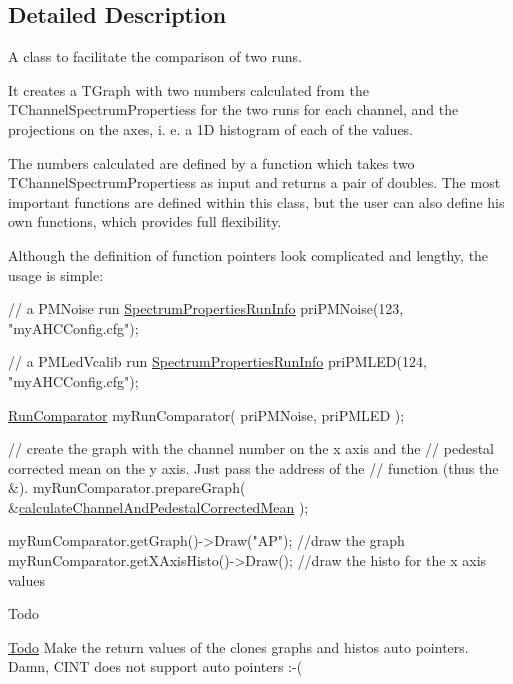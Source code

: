 \subsection{Detailed Description}
A class to facilitate the comparison of two runs. 

It creates a T\-Graph with two numbers calculated from the T\-Channel\-Spectrum\-Propertiess for the two runs for each channel, and the {\ttfamily projections} on the axes, i. e. a 1\-D histogram of each of the values.

The numbers calculated are defined by a function which takes two T\-Channel\-Spectrum\-Propertiess as input and returns a pair of doubles. The most important functions are defined within this class, but the user can also define his own functions, which provides full flexibility.

Although the definition of function pointers look complicated and lengthy, the usage is simple\-: 
\begin{DoxyCode}
\textcolor{comment}{// a PMNoise run}
\hyperlink{class_spectrum_properties_run_info}{SpectrumPropertiesRunInfo} priPMNoise(123, \textcolor{stringliteral}{"myAHCConfig.cfg"});

\textcolor{comment}{// a PMLedVcalib run}
\hyperlink{class_spectrum_properties_run_info}{SpectrumPropertiesRunInfo} priPMLED(124, \textcolor{stringliteral}{"myAHCConfig.cfg"});

\hyperlink{class_run_comparator}{RunComparator} myRunComparator( priPMNoise, priPMLED );

\textcolor{comment}{// create the graph with the channel number on the x axis and the }
\textcolor{comment}{// pedestal corrected mean on the y axis. Just pass the address of the }
\textcolor{comment}{// function (thus the &).}
myRunComparator.prepareGraph( &\hyperlink{class_run_comparator_a7e9217ea3aff2f7f2b94760b8df8884a}{calculateChannelAndPedestalCorrectedMean}
       );

myRunComparator.getGraph()->Draw(\textcolor{stringliteral}{"AP"}); \textcolor{comment}{//draw the graph}
myRunComparator.getXAxisHisto()->Draw(); \textcolor{comment}{//draw the histo for the x axis values}
\end{DoxyCode}


\begin{DoxyRefDesc}{Todo}
\item[\hyperlink{todo__todo000001}{Todo}]Make the return values of the clones graphs and histos auto pointers. Damn, C\-I\-N\-T does not support auto pointers \-:-\/( \end{DoxyRefDesc}


